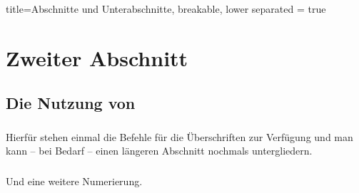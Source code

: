 \begin{refsection}
\begin{tcblisting}{title=Abschnitte und Unterabschnitte, breakable,  lower separated = true}
\section*{Zweiter Abschnitt}
\subsection*{Die Nutzung von }
\subsubsection{}
Hierfür stehen einmal die Befehle für die Überschriften zur Verfügung und man kann -- bei Bedarf -- einen längeren Abschnitt nochmals untergliedern.
\subsubsection{}
Und eine weitere Numerierung.

\end{tcblisting}
\setcounter{subsubsection}{1}

\end{refsection}

